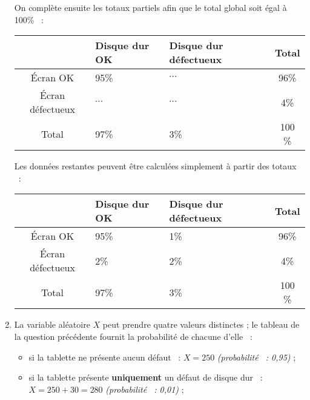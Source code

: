 \begin{corrige}
\begin{enumerate}
\begin{center}
          \end{center}
          On complète ensuite les totaux partiels afin que le total global soit égal à 100\% ~:
          \begin{center}
               \begin{tabular}{|c|p{2cm}|p{2cm}|c|}%
                    \hline
                    $\ $ & Disque dur OK & Disque dur défectueux & Total \\
                    \hline
                    \'Ecran OK &  95\% & $\cdots$ & 96\% \\
                    \hline
                    \'Ecran défectueux & $\cdots$ & $\cdots$ & 4\% \\
                    \hline
                    Total & 97\% & 3\% & 100 \% \\
                    \hline
               \end{tabular}
          \end{center}
          Les données restantes peuvent être calculées simplement à partir des totaux ~:
          \begin{center}
               \begin{tabular}{|c|p{2cm}|p{2cm}|c|}%
                    \hline
                    $\ $ & Disque dur OK & Disque dur défectueux & Total \\
                    \hline
                    \'Ecran OK &  95\% & 1\% & 96\% \\
                    \hline
                    \'Ecran défectueux & 2\% & 2\%  & 4\% \\
                    \hline
                    Total & 97\% & 3\% & 100 \% \\
                    \hline
               \end{tabular}
          \end{center}
          \item %
          La variable aléatoire $X$ peut prendre quatre valeurs distinctes ; le tableau de la question précédente fournit la probabilité de chacune d'elle ~:
          \par
          \begin{itemize}
               \item si la tablette ne présente aucun défaut ~: ${X=250}$ \textit{(probabilité ~: 0,95)} ;
               \par
               \item si la tablette présente \textbf{uniquement} un défaut de disque dur ~: ${X=250+30=280}$ \textit{(probabilité ~: 0,01)} ;

\end{itemize}
\end{enumerate}
\end{corrige}
